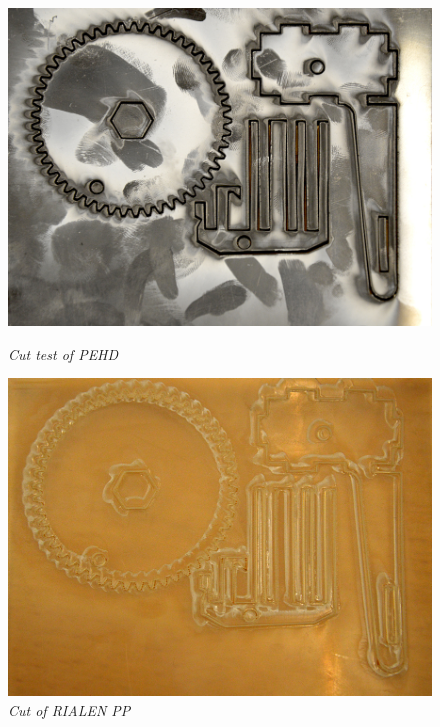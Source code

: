 \begin{figure}[h]
\begin{minipage}[b]{7.5cm}
\centering
	\includegraphics[scale=1.0]{figures/PEHD.jpg}
	\caption{\small {\it {Cut test of PEHD}}} \label{fig:PEHD}
\end{minipage}
\begin{minipage}[b]{7.5cm}
\centering
	\includegraphics[scale=1.0]{figures/PP.jpg}
	\caption{\small {\it {Cut of RIALEN PP}}} \label{fig:PP}
\end{minipage}
\end{figure}


